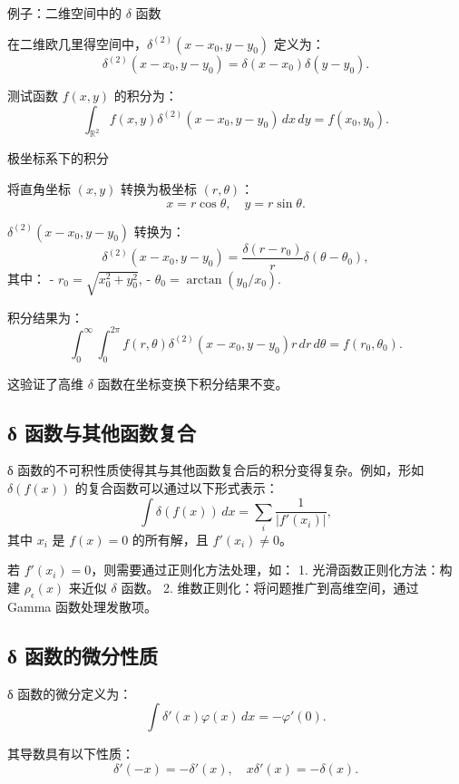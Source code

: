 \documentclass[12pt]{article}
\begin{document}
 例子：二维空间中的 $\delta$ 函数

在二维欧几里得空间中，$\delta^{(2)}(x - x_0, y - y_0)$ 定义为：
\[
\delta^{(2)}(x - x_0, y - y_0) = \delta(x - x_0) \delta(y - y_0).
\]

测试函数 $f(x, y)$ 的积分为：
\[
\int_{\mathbb{R}^2} f(x, y) \delta^{(2)}(x - x_0, y - y_0) \, dx \, dy = f(x_0, y_0).
\]

 极坐标系下的积分

将直角坐标 $(x, y)$ 转换为极坐标 $(r, \theta)$：
\[
x = r \cos\theta, \quad y = r \sin\theta.
\]

$\delta^{(2)}(x - x_0, y - y_0)$ 转换为：
\[
\delta^{(2)}(x - x_0, y - y_0) = \frac{\delta(r - r_0)}{r} \delta(\theta - \theta_0),
\]
其中：
- $r_0 = \sqrt{x_0^2 + y_0^2}$,
- $\theta_0 = \arctan(y_0 / x_0)$.

积分结果为：
\[
\int_0^\infty \int_0^{2\pi} f(r, \theta) \delta^{(2)}(x - x_0, y - y_0) r \, dr \, d\theta = f(r_0, \theta_0).
\]

这验证了高维 $\delta$ 函数在坐标变换下积分结果不变。

\subsection*{δ 函数与其他函数复合}

δ 函数的不可积性质使得其与其他函数复合后的积分变得复杂。例如，形如 $\delta(f(x))$ 的复合函数可以通过以下形式表示：
\[
\int \delta(f(x)) \, dx = \sum_i \frac{1}{|f'(x_i)|},
\]
其中 $x_i$ 是 $f(x) = 0$ 的所有解，且 $f'(x_i) \neq 0$。

若 $f'(x_i) = 0$，则需要通过正则化方法处理，如：
1. 光滑函数正则化方法：构建 $\rho_\epsilon(x)$ 来近似 $\delta$ 函数。
2. 维数正则化：将问题推广到高维空间，通过 Gamma 函数处理发散项。

\subsection*{δ 函数的微分性质}

δ 函数的微分定义为：
\[
\int \delta'(x) \varphi(x) \, dx = -\varphi'(0).
\]

其导数具有以下性质：
\[
\delta'(-x) = -\delta'(x), \quad x \delta'(x) = -\delta(x).
\]
\end{document}
